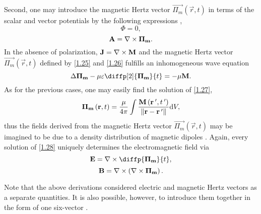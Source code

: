 Second, one may introduce the magnetic Hertz vector $ {\vec{\Pi_m}}\left(\vec{r}, t \right) $ in terms of the scalar and vector potentials by the following expressions \cite{Stratton2007},
\begin{equation}
\label{1.25}
\Phi = 0,
\end{equation}
\begin{equation}
\label{1.26}
\mathbf{A} = \nabla \times \mathbf{\Pi_m}.
\end{equation}
In the absence of polarization, $ \mathbf{J} = \nabla \times \mathbf{M} $ and the magnetic Hertz vector $ {\vec{\Pi_m}}\left(\vec{r}, t \right) $ defined by \ref{1.25} and \ref{1.26} fulfills an inhomogeneous wave equation
\begin{equation}
\label{1.27}
\laplace{\vec{\Pi_m}} - \mu \varepsilon \diffp[2]{\vec{\Pi_m}}{t} = -\mu \vec{M}.
\end{equation}
As for the previous cases, one may easily find the solution of \ref{1.27},
\begin{equation}
\label{1.28}
\mathbf{\Pi_m}\left(\mathbf{r}, t \right) = \frac{\mu}{4 \pi} \int \frac{\mathbf{M}\left(\mathbf{r^{\: \prime}}, t^{\: \prime} \right)}{\lVert\mathbf{r} - \mathbf{r^{\: \prime}}\rVert} \mathrm{d} V,
\end{equation}
thus the fields derived from the magnetic Hertz vector $ {\vec{\Pi_m}}\left(\vec{r}, t \right) $ may be imagined to be due to a density distribution of magnetic dipoles \cite{Essex1977}. Again, every solution of \ref{1.28} uniquely determines the electromagnetic field via
\begin{equation}
\label{1.29}
\vec{E} = \rot{\diffp{\vec{\Pi_m}}{t}},
\end{equation}
\begin{equation}
\label{1.30}
\mathbf{B} = \nabla \times \left(\nabla \times \mathbf{\Pi_m}\right).
\end{equation}

Note that the above derivations considered electric and magnetic Hertz vectors as a separate quantities. It is also possible, however, to introduce them together in the form of one six-vector \cite{Nisbet1955}.